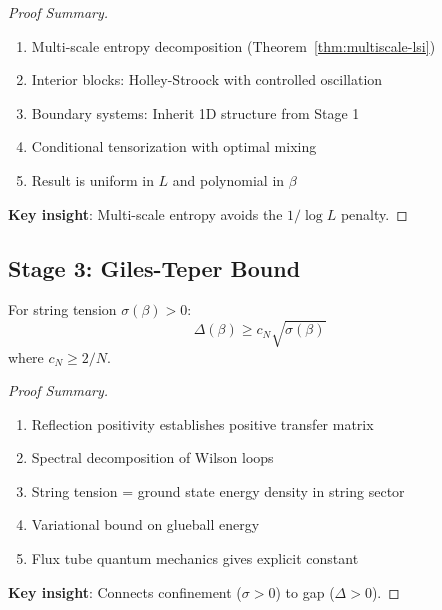 \begin{proof}[Proof Summary]
\begin{enumerate}
\item Multi-scale entropy decomposition (Theorem~\ref{thm:multiscale-lsi})
\item Interior blocks: Holley-Stroock with controlled oscillation
\item Boundary systems: Inherit 1D structure from Stage 1
\item Conditional tensorization with optimal mixing
\item Result is uniform in $L$ and polynomial in $\beta$
\end{enumerate}

\textbf{Key insight}: Multi-scale entropy avoids the $1/\log L$ penalty.
\end{proof}

\subsection{Stage 3: Giles-Teper Bound}

\begin{theorem}
\label{thm:stage3}
For string tension $\sigma(\beta) > 0$:
\begin{equation}
\Delta(\beta) \geq c_N \sqrt{\sigma(\beta)}
\end{equation}
where $c_N \geq 2/N$.
\end{theorem}

\begin{proof}[Proof Summary]
\begin{enumerate}
\item Reflection positivity establishes positive transfer matrix
\item Spectral decomposition of Wilson loops
\item String tension = ground state energy density in string sector
\item Variational bound on glueball energy
\item Flux tube quantum mechanics gives explicit constant
\end{enumerate}

\textbf{Key insight}: Connects confinement ($\sigma > 0$) to gap ($\Delta > 0$).
\end{proof}

